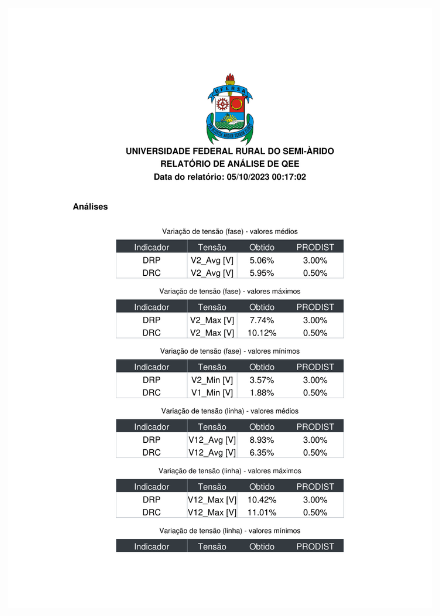\begin{figure}[H]
	\centering
  \includegraphics[height=20cm, page=3, clip]{contents/post_textual/analise_amostra_1.pdf}
\end{figure}
